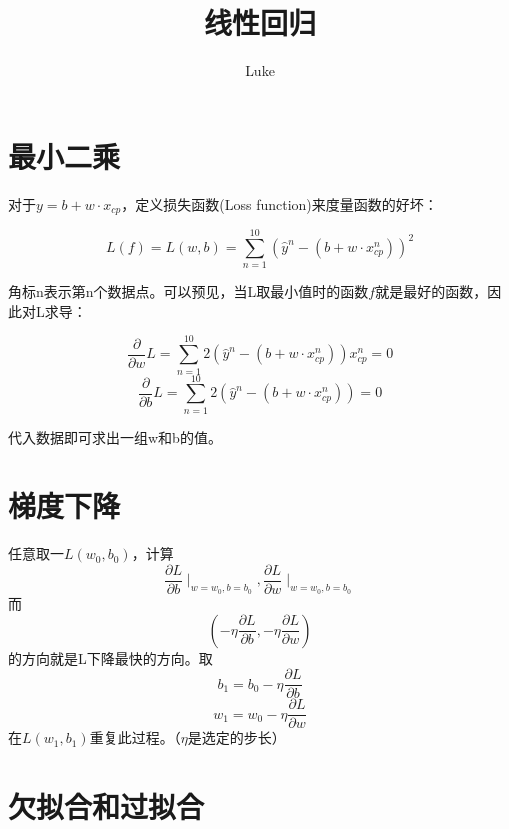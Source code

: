 \documentclass[UTF8,a4paper]{ctexart}
\title{线性回归}
\author{Luke}
\begin{document}
\maketitle

\section{最小二乘}

对于$y=b+w\cdot x_{cp}$，定义损失函数(Loss function)来度量函数的好坏：

\begin{equation}
L(f)=L(w,b)=\sum^{10}_{n=1}(\hat{y}^n-(b+w\cdot x^{n}_{cp}))^2
\end{equation}

角标n表示第n个数据点。可以预见，当L取最小值时的函数$f$就是最好的函数，因此对L求导：

\begin{equation}
\frac{\partial}{\partial w}L=\sum^{10}_{n=1}2(\hat{y}^n-(b+w\cdot x^{n}_{cp}))x^{n}_{cp}=0
\end{equation}
\begin{equation}
\frac{\partial}{\partial b}L=\sum^{10}_{n=1}2(\hat{y}^n-(b+w\cdot x^{n}_{cp}))=0
\end{equation}

代入数据即可求出一组w和b的值。

\section{梯度下降}

任意取一$L(w_0,b_0)$，计算
\[\frac{\partial L}{\partial b}\mid _{w=w_0,b=b_0},\frac{\partial L}{\partial w}\mid _{w=w_0,b=b_0}\]
而
\[(-\eta\frac{\partial L}{\partial b},-\eta\frac{\partial L}{\partial w})\]
的方向就是L下降最快的方向。取
\[b_1=b_0-\eta\frac{\partial L}{\partial b}\]
\[w_1=w_0-\eta\frac{\partial L}{\partial w}\]
在$L(w_1,b_1)$重复此过程。（$\eta$是选定的步长）

\section{欠拟合和过拟合}
\end{document}
